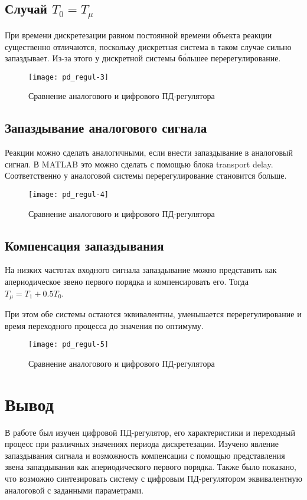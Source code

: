     \subsection{Случай $T_0 = T_\mu$}
    При времени дискретезации равном постоянной времени объекта реакции существенно отличаются,
    поскольку дискретная система в таком случае сильно запаздывает.
    Из-за этого у дискретной системы б\'{о}льшее перерегулирование.
    \begin{figure}[H]
        \centering\texttt{[image: pd\_regul-3]}
        \caption{Сравнение аналогового и цифрового ПД-регулятора}
    \end{figure}

    \subsection{Запаздывание аналогового сигнала}
    Реакции можно сделать аналогичными, если внести запаздывание в аналоговый сигнал.
    В MATLAB это можно сделать с помощью блока transport delay. Соответственно у аналоговой системы перерегулирование
    становится больше.
    \begin{figure}[H]
        \centering\texttt{[image: pd\_regul-4]}
        \caption{Сравнение аналогового и цифрового ПД-регулятора}
    \end{figure}

    \subsection{Компенсация запаздывания}
    На низких частотах входного сигнала запаздывание можно представить как апериодическое звено первого порядка и
    компенсировать его. Тогда $T_\mu = T_1 + 0.5T_0$.

    При этом обе системы остаются эквивалентны, уменьшается перерегулирование и время переходного процесса до значения
    по оптимуму.
    \begin{figure}[H]
        \centering\texttt{[image: pd\_regul-5]}
        \caption{Сравнение аналогового и цифрового ПД-регулятора}
    \end{figure}


    \section{Вывод}
    В работе был изучен цифровой ПД-регулятор, его характеристики и переходный процесс при различных значениях периода
    дискретезации.
    Изучено явление запаздывания сигнала и возможность компенсации с помощью представления звена запаздывания как
    апериодического первого порядка.
    Также было показано, что возможно синтезировать систему с цифровым ПД-регулятором эквивалентную
    аналоговой с заданными параметрами.


